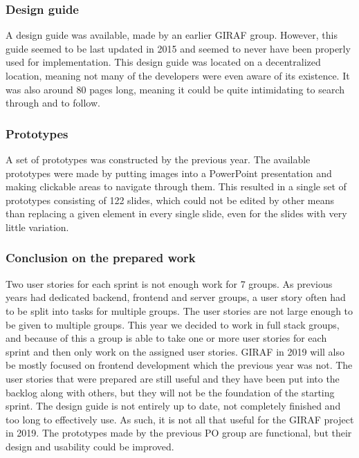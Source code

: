 \subsubsection{Design guide}
A design guide was available, made by an earlier GIRAF group.
However, this guide seemed to be last updated in 2015 and seemed to never have been properly used for implementation.
This design guide was located on a decentralized location, meaning not many of the developers were even aware of its existence.
It was also around 80 pages long, meaning it could be quite intimidating to search through and to follow.

\subsubsection{Prototypes}
A set of prototypes was constructed by the previous year.
The available prototypes were made by putting images into a PowerPoint presentation and making clickable areas to navigate through them.
This resulted in a single set of prototypes consisting of 122 slides, which could not be edited by other means than replacing a given element in every single slide, even for the slides with very little variation.


\subsubsection{Conclusion on the prepared work}
Two user stories for each sprint is not enough work for 7 groups. 
As previous years had dedicated backend, frontend and server groups, a user story often had to be split into tasks for multiple groups.
The user stories are not large enough to be given to multiple groups.
This year we decided to work in full stack groups, and because of this a group is able to take one or more user stories for each sprint and then only work on the assigned user stories.
GIRAF in 2019 will also be mostly focused on frontend development which the previous year was not.
The user stories that were prepared are still useful and they have been put into the backlog along with others, but they will not be the foundation of the starting sprint.
The design guide is not entirely up to date, not completely finished and too long to effectively use.
As such, it is not all that useful for the GIRAF project in 2019.
The prototypes made by the previous PO group are functional, but their design and usability could be improved. 


